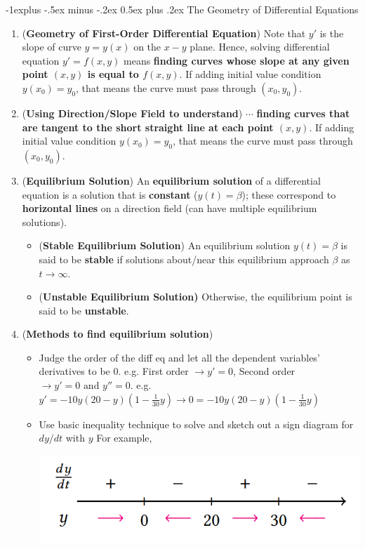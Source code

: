 \documentclass[10pt, landscape]{article}
\makeatletter
\renewcommand{\subsection}{\@startsection{subsection}{2}{0mm}%
                                {-1explus -.5ex minus -.2ex}%
                                {0.5ex plus .2ex}%
                                {\normalfont\normalsize\bfseries}}
\makeatother
\begin{document}
\begin{multicols}{4}
\subsection{The Geometry of Differential Equations}
\begin{enumerate}
    \item (\textbf{Geometry of First-Order Differential Equation}) Note that $y'$ is the slope of curve $y=y(x)$ on the $x-y$ plane. Hence, solving differential equation $y'=f(x,y)$ means \textbf{finding curves whose slope at any given point $(x,y)$ is equal to $f(x,y)$}. If adding initial value condition $y(x_0)=y_0$, that means the curve must pass through $(x_0, y_0)$.
    \item (\textbf{Using Direction/Slope Field to understand}) $\cdots$ \textbf{finding curves that are tangent to the short straight line at each point $(x,y)$}. If adding initial value condition $y(x_0)=y_0$, that means the curve must pass through $(x_0, y_0)$.
    \item (\textbf{Equilibrium Solution}) An \textbf{equilibrium solution} of a differential equation is a solution that is \textbf{constant} ($y(t)=\beta$); these correspond to \textbf{horizontal lines} on a direction field (can have multiple equilibrium solutions).
    \begin{itemize}
        \item (\textbf{Stable Equilibrium Solution}) An equilibrium solution $y(t)=\beta$ is said to be \textbf{stable} if solutions about/near this equilibrium approach $\beta$ as $t\to \infty$.
        \item (\textbf{Unstable Equilibrium Solution)} Otherwise, the equilibrium point is said to be \textbf{unstable}.
    \end{itemize}
    \item (\textbf{Methods to find equilibrium solution})
    \begin{itemize}
        \item Judge the order of the diff eq and let all the dependent variables' derivatives to be 0. e.g. First order $\rightarrow y'=0$, Second order $\rightarrow y'=0 \text{ and } y''=0$. e.g. $y'=-10y(20-y)(1-\frac{1}{30}y)\rightarrow 0=-10y(20-y)(1-\frac{1}{30}y)$
        \item Use basic inequality technique to solve and sketch out a sign diagram for $dy/dt$ with $y$ For example,\\
        \centerline{\includegraphics[width=0.9\linewidth]{image/sign-diagram-for-dydt.png}}

\end{itemize}
\end{enumerate}
\end{multicols}
\end{document}
